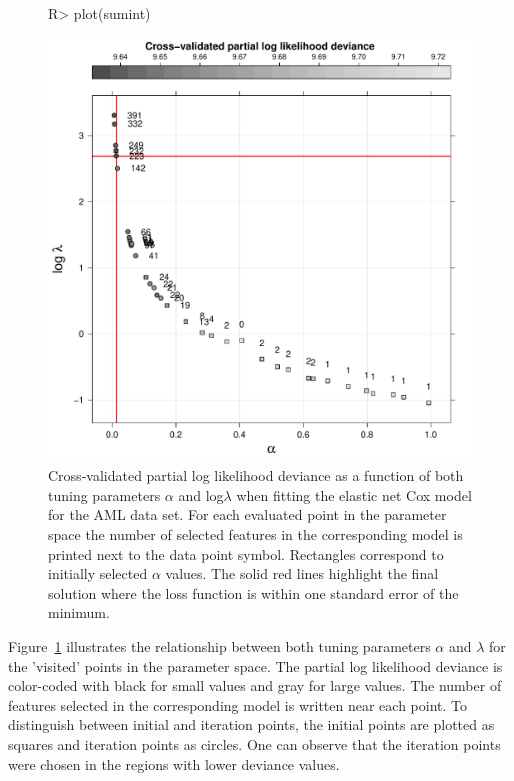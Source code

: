 \documentclass[nojss]{jss}
\begin{document}
\begin{figure}[t!]
\begin{center}
\begin{Schunk}
\begin{Sinput}
R> plot(sumint)
\end{Sinput}
\end{Schunk}
\includegraphics{c060_vignette-interval_search_cox_out_plot1}
\end{center}
\caption{Cross-validated partial log likelihood deviance as a function of both tuning parameters $\alpha$ and log$\lambda$ when fitting the elastic net Cox model for the AML data set. For each evaluated point in the parameter space the number of selected features in the corresponding model is printed next to the data point symbol. Rectangles correspond to initially selected $\alpha$ values. The solid red lines highlight the final solution where the loss function is within one standard error of the minimum. }
\label{fig:interval_search1}
\end{figure}

Figure~\ref{fig:interval_search1} illustrates the relationship between both tuning parameters $\alpha$ and $\lambda$ for the 'visited' points in the parameter space. The partial log likelihood deviance is  color-coded with black for small values and gray for large values.  The number of features selected  in the corresponding model is written near each point. 
To distinguish between initial and iteration points, the initial points are plotted as  squares and iteration points as circles. One can observe that the iteration points were chosen in the regions with lower deviance values.
\end{document}
